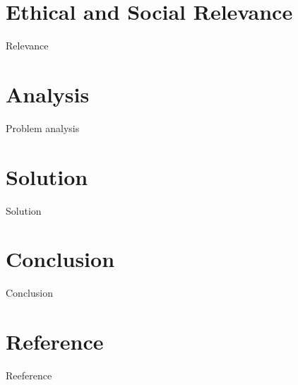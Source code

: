 \documentclass{beamer}
\begin{document}
	\section{Ethical and Social Relevance}
	\begin{frame}{Relevance}
	\end{frame}
	\section{Analysis}
	\begin{frame}{Problem analysis}
	\end{frame}
	\section{Solution}
	\begin{frame}{Solution}
	\end{frame}
	\section{Conclusion}
	\begin{frame}{Conclusion}
	\end{frame}
	\section{Reference}
	\begin{frame}{Reeference}
	\end{frame}
\end{document}
